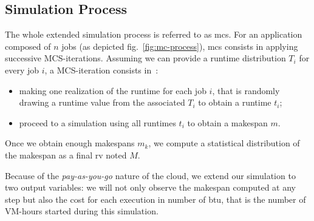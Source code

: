 \documentclass[10pt,conference,compsocconf]{IEEEtran}
\begin{document}
\subsection{Simulation Process}

The whole extended simulation process is referred to as \ac{mcs}. 
For an application composed of $n$ jobs (as depicted fig.~\ref{fig:mc-process}),
\ac{mcs} consists in applying successive MCS-iterations. Assuming we can provide a
runtime distribution $T_i$ for every job $i$, a MCS-iteration consists in~:
\begin{itemize}
\item making one realization of the runtime  for each job $i$, that is randomly
  drawing a runtime value from the associated $T_i$ to obtain a runtime $t_i$;
\item proceed to a simulation using all runtimes $t_i$ to obtain a makespan $m$.
\end{itemize}
Once we obtain enough makespans $m_k$, we compute  a statistical distribution of
the makespan  as a final \ac{rv} noted $M$.

Because of the \emph{pay-as-you-go} nature of the cloud, we extend our simulation
to two output variables: we will not only observe the makespan computed at any
step but also the cost for each execution in number of \ac{btu}, that is the
number of VM-hours started during this simulation.
\end{document}
